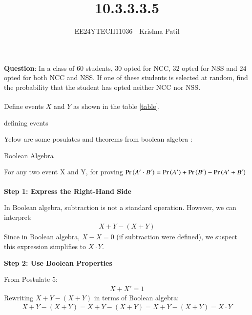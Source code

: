 \documentclass[journal]{IEEEtran}
\begin{document}

\vspace{3cm}

\title{10.3.3.3.5}
\author{EE24YTECH11036 - Krishna Patil}
{\let\newpage\relax\maketitle}
\renewcommand{\thefigure}{\theenumi}
\renewcommand{\thetable}{\theenumi}
\setlength{\intextsep}{10pt} %


\textbf{Question}: In a class of $60$ students, $30$ opted for NCC, $32$ opted for NSS and $24$ opted for both NCC and NSS. If one of these students is selected at random, find the probability that the student has opted neither NCC nor NSS. \\ \\
\solution
Define events $X$ and $Y$ as shown in the table \ref{table}, \\
\begin{table}[h!]    
  \centering
  
  \caption{defining events}
  \label{table}
\end{table}
\newline Yelow are some posulates and theorems from boolean algebra :
\begin{table}[h!]    
  \centering
  
  \caption{Boolean Algebra}
  \label{table2}
\end{table}
\newline For any two event X and Y,  for proving $\Pr\left(A^\prime \cdot B^\prime\right) = \Pr\left(A^\prime\right) + \Pr\left(B^\prime\right) - \Pr\left(A^\prime + B^\prime\right)$  \\ \\
\textbf{Step 1: Express the Right-Hand Side}

In Boolean algebra, subtraction is not a standard operation. However, we can interpret:
\begin{align}
X + Y - (X + Y)
\end{align}
Since in Boolean algebra, \( X - X = 0 \) (if subtraction were defined), we suspect this expression simplifies to \( X \cdot Y \).

\textbf{Step 2: Use Boolean Properties}

From Postulate 5:
\begin{align}
X + X' = 1
\end{align}
Rewriting \( X + Y - (X + Y) \) in terms of Boolean algebra:
\begin{align}
X + Y - (X + Y) = X + Y - (X + Y) = X + Y - (X + Y) = X \cdot Y
\end{align}
\end{document}
